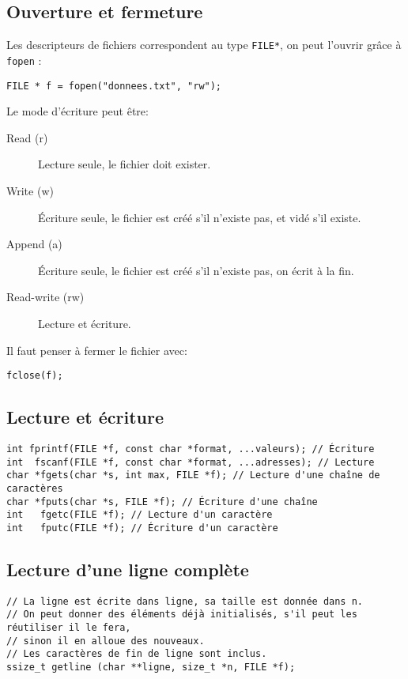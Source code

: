 \documentclass[10pt,a4paper,french]{article}
\begin{document}
\subsection{Ouverture et fermeture}

Les descripteurs de fichiers correspondent au type {\tt FILE*}, on peut l'ouvrir grâce à {\tt fopen} :

\begin{verbatim}
FILE * f = fopen("donnees.txt", "rw");
\end{verbatim}

Le mode d'écriture peut être:
\begin{description}
\item[Read (r)] Lecture seule, le fichier doit exister.
\item[Write (w)] Écriture seule, le fichier est créé s'il n'existe pas, et vidé s'il existe.
\item[Append (a)] Écriture seule, le fichier est créé s'il n'existe pas, on écrit à la fin.
\item[Read-write (rw)] Lecture et écriture.
\end{description}

Il faut penser à fermer le fichier avec:

\begin{verbatim}
fclose(f);
\end{verbatim}

\subsection{Lecture et écriture}

\begin{verbatim}
int fprintf(FILE *f, const char *format, ...valeurs); // Écriture
int  fscanf(FILE *f, const char *format, ...adresses); // Lecture
char *fgets(char *s, int max, FILE *f); // Lecture d'une chaîne de caractères
char *fputs(char *s, FILE *f); // Écriture d'une chaîne
int   fgetc(FILE *f); // Lecture d'un caractère
int   fputc(FILE *f); // Écriture d'un caractère
\end{verbatim}

\subsection{Lecture d'une ligne complète}

\begin{verbatim}
// La ligne est écrite dans ligne, sa taille est donnée dans n.
// On peut donner des éléments déjà initialisés, s'il peut les réutiliser il le fera,
// sinon il en alloue des nouveaux.
// Les caractères de fin de ligne sont inclus.
ssize_t getline (char **ligne, size_t *n, FILE *f);
\end{verbatim}
\end{document}

